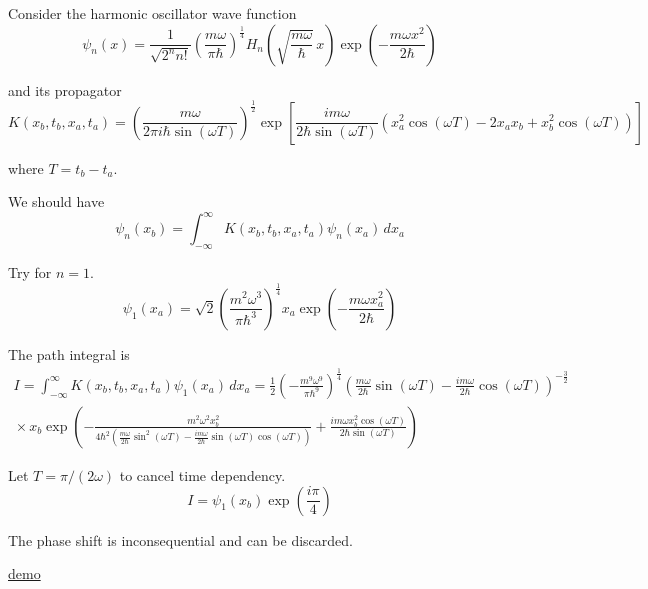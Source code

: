 

Consider the harmonic oscillator wave function
\begin{equation*}
\psi_n(x)=\frac{1}{\sqrt{2^nn!}}\left(\frac{m\omega}{\pi\hbar}\right)^\frac{1}{4}
H_n\left(\sqrt{\frac{m\omega}{\hbar}}\,x\right)
\exp\left(-\frac{m\omega x^2}{2\hbar}\right)
\end{equation*}

and its propagator
\begin{equation*}
K(x_b,t_b,x_a,t_a)
=\left(\frac{m\omega}{2\pi i\hbar\sin(\omega T)}\right)^\frac{1}{2}
\exp\left[
\frac{im\omega}{2\hbar\sin(\omega T)}
\left(x_a^2\cos(\omega T)-2x_ax_b+x_b^2\cos(\omega T)\right)
\right]
\end{equation*}

where $T=t_b-t_a$.

\bigskip
We should have
\begin{equation*}
\psi_n(x_b)=\int_{-\infty}^\infty K(x_b,t_b,x_a,t_a)\psi_n(x_a)\,dx_a
\end{equation*}

Try for $n=1$.
\begin{equation*}
\psi_1(x_a)=\sqrt2\left(\frac{m^2\omega^3}{\pi\hbar^3}\right)^\frac{1}{4}
x_a\exp\left(-\frac{m\omega x_a^2}{2\hbar}\right)
\end{equation*}

The path integral is
\begin{multline*}
I=\int_{-\infty}^\infty K(x_b,t_b,x_a,t_a)\psi_1(x_a)\,dx_a
=\frac{1}{2}\left(-\frac{m^9\omega^9}{\pi\hbar^9}\right)^\frac{1}{4}
\left(\frac{m\omega}{2\hbar}\sin(\omega T)
-\frac{im\omega}{2\hbar}\cos(\omega T)\right)^{-\frac{3}{2}}
\\{}\times
x_b\exp\left(
-\frac{m^2\omega^2x_b^2}
{4\hbar^2\left(\frac{m\omega}{2\hbar}\sin^2(\omega T)
-\frac{im\omega}{2\hbar}\sin(\omega T)\cos(\omega T)\right)}
+\frac{im\omega x_b^2\cos(\omega T)}{2\hbar\sin(\omega T)}
\right)
\end{multline*}

Let $T=\pi/(2\omega)$ to cancel time dependency.
\begin{equation*}
I=\psi_1(x_b)\exp\left(\frac{i\pi}{4}\right)
\end{equation*}

The phase shift is inconsequential and can be discarded.

\bigskip
\href{https://georgeweigt.github.io/blog/10.html}{demo}


